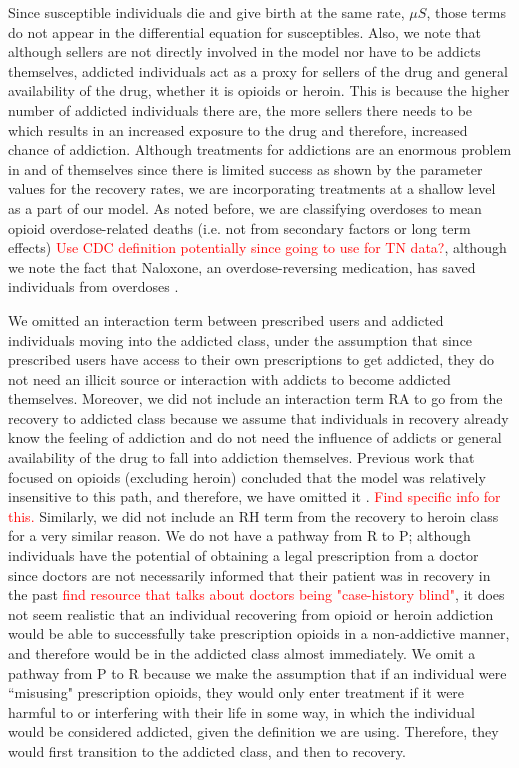 \documentclass[12pt]{article}
\begin{document}
Since susceptible individuals die and give birth at the same rate, $\mu S$, those terms do not appear in the differential equation for susceptibles. Also, we note that although sellers are not directly involved in the model nor have to be addicts themselves, addicted individuals act as a proxy for sellers of the drug and general availability of the drug, whether it is opioids or heroin. This is because the higher number of addicted individuals there are, the more sellers there needs to be which results in an increased exposure to the drug and therefore, increased chance of addiction. Although treatments for addictions are an enormous problem in and of themselves since there is limited success as shown by the parameter values for the recovery rates, we are incorporating treatments at a shallow level as a part of our model. As noted before, we are classifying overdoses to mean opioid overdose-related deaths (i.e. not from secondary factors or long term effects) \textcolor{red}{Use CDC definition potentially since going to use for TN data?},
although we note the fact that Naloxone, an overdose-reversing medication, has saved individuals from overdoses \cite{NIDA2}. 

We omitted an interaction term between prescribed users and addicted individuals moving into the addicted class, under the assumption that since prescribed users have access to their own prescriptions to get addicted, they do not need an illicit source or interaction with addicts to become addicted themselves. Moreover, we did not include an interaction term RA to go from the recovery to addicted class because we assume that individuals in recovery already know the feeling of addiction and do not need the influence of addicts or general availability of the drug to fall into addiction themselves. Previous work that focused on opioids (excluding heroin) concluded that the model was relatively insensitive to this path, and therefore, we have omitted it \cite{Battista}. \textcolor{red}{Find specific info for this.} Similarly, we did not include an RH term from the recovery to heroin class for a very similar reason. We do not have a pathway from R to P; although individuals have the potential of obtaining a legal prescription from a doctor since doctors are not necessarily informed that their patient was in recovery in the past \textcolor{red}{find resource that talks about doctors being "case-history blind"}, it does not seem realistic that an individual recovering from opioid or heroin addiction would be able to successfully take prescription opioids in a non-addictive manner, and therefore would be in the addicted class almost immediately. We omit a pathway from P to R because we make the assumption that if an individual were ``misusing" prescription opioids, they would only enter treatment if it were harmful to or interfering with their life in some way, in which the individual would be considered addicted, given the definition we are using. Therefore, they would first transition to the addicted class, and then to recovery. \\
\end{document}
